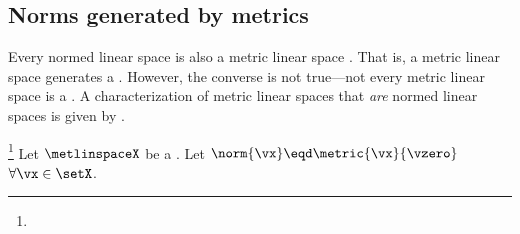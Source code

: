 \subsection{Norms generated by metrics}
Every normed linear space is also a metric linear space .
That is, a metric linear space generates a .
However, the converse is not true---not every metric linear space is a .
A characterization of metric linear spaces that \emph{are} normed linear spaces is given by .
\begin{lemma}
\footnote{
  }
\label{lem:vsn_ti}
Let $\metlinspaceX$ be a .
Let $\norm{\vx}\eqd \metric{\vx}{\vzero}$ $\forall\vx\in\setX$.
\end{lemma}

